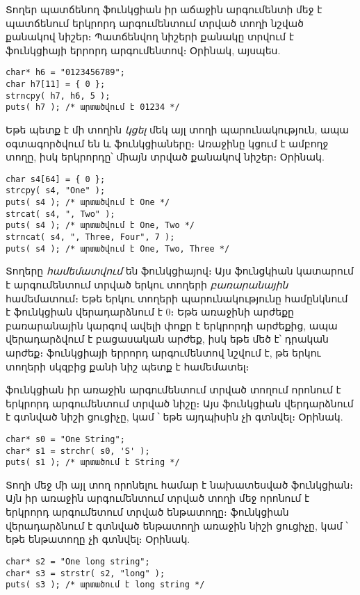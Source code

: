 Տողեր պատճենող  ֆունկցիան իր աճաջին արգումենտի
մեջ է պատճենում երկրորդ արգումենտում տրված տողի նշված քանակով
նիշեր։ Պատճենվող նիշերի քանակը տրվում է ֆունկցիայի երրորդ
արգումենտով։ Օրինակ, այսպես.

\begin{Verbatim}
char* h6 = "0123456789";
char h7[11] = { 0 };
strncpy( h7, h6, 5 );
puts( h7 ); /* արտածվում է 01234 */
\end{Verbatim}

Եթե պետք է մի տողին \emph{կցել} մեկ այլ տողի պարունակություն, ապա
օգտագործվում են  և  ֆունկցիաները։
Առաջինը կցում է ամբողջ տողը, իսկ երկրորդը՝ միայն տրված քանակով
նիշեր։ Օրինակ.

\begin{Verbatim}
char s4[64] = { 0 };
strcpy( s4, "One" );
puts( s4 ); /* արտածվում է One */
strcat( s4, ", Two" );
puts( s4 ); /* արտածվում է One, Two */
strncat( s4, ", Three, Four", 7 );
puts( s4 ); /* արտածվում է One, Two, Three */
\end{Verbatim}

Տողերը \emph{համեմատվում} են  ֆունկցիայով։ Այս
ֆունցկիան կատարում է արգումենտում տրված երկու տողերի
\emph{բառարանային} համեմատում։ Եթե երկու տողերի պարունակությունը
համընկնում է  ֆունկցիան վերադարձնում է \(0\)։ Եթե
առաջինի արժեքը բառարանային կարգով ավելի փոքր է երկրորդի արժեքից,
ապա վերադարձվում է բացասական արժեք, իսկ եթե մեծ է՝ դրական արժեք։
 ֆունկցիայի երրորդ արգումենտով նշվում է, թե երկու
տողերի սկզբից քանի նիշ պետք է համեմատել։

 ֆունկցիան իր առաջին արգումենտում տրված տողում
որոնում է երկրորդ արգումենտում տրված նիշը։ Այս ֆունկցիան
վերդարձնում է գտնված նիշի ցուցիչը, կամ ՝ եթե
այդպիսին չի գտնվել։ Օրինակ.

\begin{Verbatim}
char* s0 = "One String";
char* s1 = strchr( s0, 'S' );
puts( s1 ); /* արտածում է String */
\end{Verbatim}

Տողի մեջ մի այլ տող որոնելու համար է նախատեսված 
ֆունկցիան։ Այն իր առաջին արգումենտում տրված տողի մեջ որոնում է
երկրորդ արգումետում տրված ենթատողը։  ֆունկցիան
վերադարձնում է գտնված ենթատողի առաջին նիշի ցուցիչը, կամ
՝ եթե ենթատողը չի գտնվել։ Օրինակ.

\begin{Verbatim}
char* s2 = "One long string";
char* s3 = strstr( s2, "long" );
puts( s3 ); /* արտածում է long string */
\end{Verbatim}

